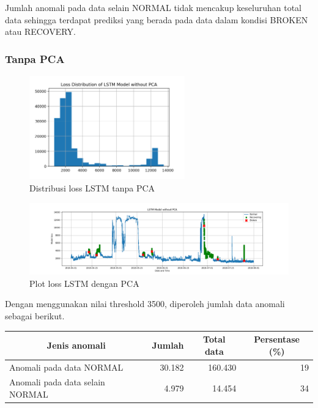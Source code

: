     Jumlah anomali pada data selain NORMAL tidak mencakup keseluruhan total data sehingga terdapat prediksi yang berada pada data dalam kondisi BROKEN atau RECOVERY.

    \subsubsection{Tanpa PCA}

    \begin{figure}[h]
        \centering
        \includegraphics[width=0.6\textwidth]{resources/LSTM/LSTM_noPCA_LossDist.png}
        \caption{Distribusi loss LSTM tanpa PCA}
    \end{figure}

    \begin{figure}[h]
        \centerline{\includegraphics[width=1.4\textwidth]{resources/LSTM/LSTM_noPCA_model_loss.png}}
        \caption{Plot loss LSTM dengan PCA}
    \end{figure}

    Dengan menggunakan nilai threshold 3500, diperoleh jumlah data anomali sebagai berikut.

    \begin{table}[h]
        \centering
        \begin{tabular}{|l|r|r|r|}
            \hline
            \multicolumn{1}{|c|}{\textbf{Jenis anomali}} & \multicolumn{1}{c|}{\textbf{Jumlah}} & \multicolumn{1}{c|}{\textbf{Total data}} & \multicolumn{1}{c|}{\textbf{Persentase (\%)}} \\ \hline
            Anomali pada data NORMAL                     & 30.182                                & 160.430                                   & 19                                       \\ \hline
            Anomali pada data selain NORMAL              & 4.979                                 & 14.454                                    & 34                                       \\ \hline
        \end{tabular}
    \end{table}

